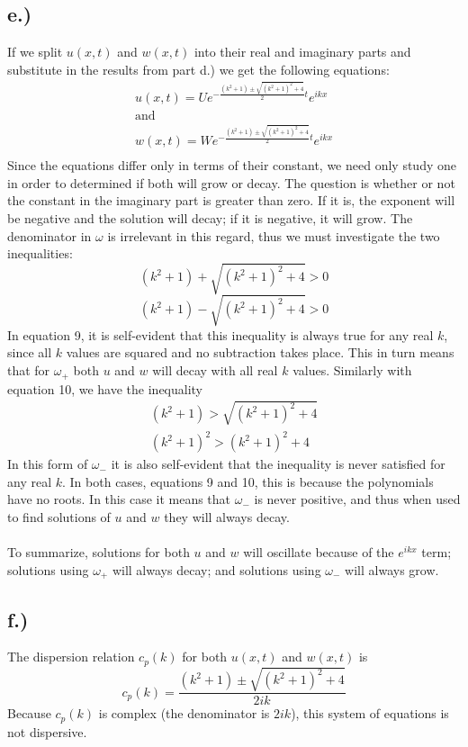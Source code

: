\documentclass{article}
\begin{document}
\subsection*{e.)}
If we split $u(x, t)$ and $w(x,t)$ into their real and imaginary parts and substitute in the results from part d.) we get the following equations:
\begin{equation}
\begin{aligned}
u(x, t) = Ue^{-\frac{(k^2 + 1) \pm \sqrt{(k^2 + 1)^2 +4}}{2}t}e^{ikx}\\
\text{and}\\
w(x, t) = We^{-\frac{(k^2 + 1) \pm \sqrt{(k^2 + 1)^2 +4}}{2}t}e^{ikx}\\
\end{aligned}
\end{equation}
Since the equations differ only in terms of their constant, we need only study one in order to determined if both will grow or decay. The question is whether or not the constant in the imaginary part is greater than zero. If it is, the exponent will be negative and the solution will decay; if it is negative, it will grow. The denominator in $\omega$ is irrelevant in this regard, thus we must investigate the two inequalities:
\begin{equation}
(k^2 + 1) + \sqrt{(k^2 + 1)^2 +4} > 0
\end{equation}
\begin{equation}
(k^2 + 1) - \sqrt{(k^2 + 1)^2 +4} > 0
\end{equation}
In equation 9, it is self-evident that this inequality is always true for any real $k$, since all $k$ values are squared and no subtraction takes place. This in turn means that for $\omega_+$ both $u$ and $w$ will decay with all real $k$ values.
Similarly with equation 10, we have the inequality
\begin{equation}
\begin{aligned}
(k^2 + 1) > \sqrt{(k^2 + 1)^2 +4}\\
(k^2 + 1)^2 > (k^2 +1)^2 + 4
\end{aligned}
\end{equation}
In this form of $\omega_-$ it is also self-evident that the inequality is never satisfied for any real $k$. In both cases, equations 9 and 10, this is because the polynomials have no roots. In this case it means that $\omega_-$ is never positive, and thus when used to find solutions of $u$ and $w$ they will always decay.
\\
\\
To summarize, solutions for both $u$ and $w$ will oscillate because of the $e^{ikx}$ term; solutions using $\omega_+$ will always decay; and solutions using $\omega_-$ will always grow.
\subsection*{f.)}
The dispersion relation $c_p(k)$ for both $u(x,t)$ and $w(x, t)$ is 
\begin{equation}
c_p(k) = \frac{(k^2 + 1) \pm \sqrt{(k^2 + 1)^2 +4}}{2ik}
\end{equation}
Because $c_p(k)$ is complex (the denominator is $2ik$), this system of equations is not dispersive. 
\end{document}
